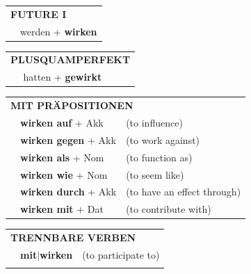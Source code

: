 \documentclass[10pt,a4paper]{revtex4-2}
\begin{document}
\begin{verbbox}
\begin{tabular}{rl}
    \multicolumn{2}{l}{\textbf{FUTURE I} }\\
  &  werden + \textbf{wirken}\\
 
  \end{tabular}
\hfill
   \begin{tabular}{rl}
      \multicolumn{2}{l}{\textbf{PLUSQUAMPERFEKT}}\\
  &  hatten + \textbf{gewirkt}\\
  \end{tabular}

   \vspace{10pt}

   \begin{tabular}{lll}
      \multicolumn{3}{l}{\textbf{MIT PRÄPOSITIONEN}}\\
& \textbf{wirken auf} + Akk & (to influence)\\
& \textbf{wirken gegen} + Akk & (to work against)\\
&\textbf{wirken als} + Nom & (to function as)\\
&\textbf{wirken wie} + Nom & (to seem like)\\
&\textbf{wirken durch} + Akk & (to have an effect through)\\
&\textbf{wirken mit} + Dat & (to contribute with)
  \end{tabular}
  \hfill
   \begin{tabular}{lll}
      \multicolumn{3}{l}{\textbf{TRENNBARE VERBEN}}\\
 & \textbf{mit$|$wirken} & (to participate to)\\
\vspace{40pt}
  \end{tabular}


  \vspace{-5pt}


\end{verbbox}
\end{document}
